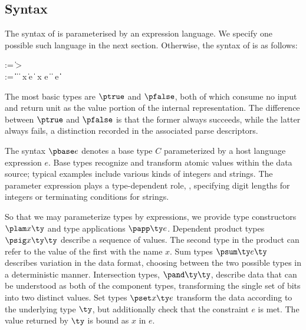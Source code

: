 \subsection{\ddc{} Syntax}
The syntax of \ddc{} is parameterised by an expression language.  We specify one possible such language in the next section.  Otherwise,
the syntax of \ddc{} is as follows:
\begin{bnf}
   \meta{\gk} \::= \kty \| \ity \-> \gk 
                               \pext{\| \gk \-> \gk} \\
   \meta{\ty} \::= 
    \ptrue\| \pfalse \|  \| 
    \plam{\var}{\ity}{\ty} \|  \nlalt
    \psig x \ty \ty \| \psum \ty e \ty \| \pand \ty \ty \nlalt 
    \pset x \ty e \|
    \pseq \ty {} \nlalt
    \ptyvar \| \pmu{\ptyvar}{\ty} \nlalt
    \pcompute e \ity \| \pabsorb \ty \| \pscan{\ty} 
\end{bnf}%
\noindent
The most basic types are $\ptrue$ and $\pfalse$, both of which consume no input
and return unit as the value portion of the internal representation. 
The difference between $\ptrue$ and $\pfalse$ is that the former always succeeds, while the latter always fails, a distinction recorded in the associated parse descriptors.


The syntax $\pbase e$ denotes a base type $C$ parameterized by a host language expression $e$.
Base types recognize and transform atomic values within the
data source; typical examples include various kinds of integers and strings. 
The parameter expression plays a type-dependent role, \eg{}, specifying digit lengths for integers or terminating conditions for strings.

So that we may parameterize types by expressions, we provide type constructors
$\plam x {} \ty$ and type applications $\papp \ty e$.
Dependent product types $\psig x \ty \ty$ describe a sequence of
values. The second type in the product can refer to the value of the
first with the name $x$. Sum types $\psum \ty e \ty$ describes
variation in the data format, choosing between the two possible types
in a deterministic manner. Intersection types, $\pand \ty \ty$,
describe data that can be understood as both of the component types,
transforming the single set of bits into two distinct values.  Set
types $\pset x \ty e$ transform the data according to the underlying
type $\ty$, but additionally check that the constraint $e$ is met.
The value returned by $\ty$ is bound as $x$ in $e$.

